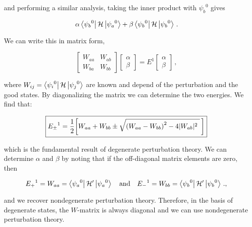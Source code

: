 \documentclass[12pt, titlepage]{article}
\begin{document}
and performing a similar analysis, taking the inner product with ${\psi_b}^0$ gives

\begin{equation}
\alpha\bra{{\psi_b}^0}\mathcal{H}\ket{{\psi_a}^0} + \beta\bra{{\psi_b}^0}\mathcal{H}\ket{{\psi_b}^0} \,. 
\end{equation}

We can write this in matrix form, 

\begin{equation}
	\begin{bmatrix}
	W_{aa} & W_{ab} \\ W_{ba} & W_{bb}
	\end{bmatrix}
	\begin{bmatrix}
	\alpha \\ \beta
	\end{bmatrix}
	= E^1
		\begin{bmatrix}
	\alpha \\ \beta
	\end{bmatrix} \,,
\end{equation}

where $W_{ij} = \bra{{\psi_i}^0}\mathcal{H}\ket{{\psi_j}^0}$ are known and depend of the perturbation and the good states. By diagonalizing the matrix we can determine the two energies. We find that:

\begin{equation}
	\boxed{{E_\pm}^1 = \frac{1}{2}\qty[W_{aa} + W_{bb} \pm \sqrt{\qty(W_{aa} - W_{bb})^2 - 4|W_{ab}|^2 \,\,}\,] }
\end{equation}

which is the fundamental result of degenerate perturbation theory. We can determine $\alpha$ and $\beta$ by noting that if the off-diagonal matrix elements are zero, then 

\begin{equation*}
	{E_+}^1 = W_{aa} = \bra{{\psi_a}^0}\mathcal{H}^\prime\ket{{\psi_a}^0} \quad\text{and}\quad {E_-}^1 = W_{bb} = \bra{{\psi_b}^0}\mathcal{H}^\prime\ket{{\psi_b}^0} \,.,
\end{equation*}

and we recover nondegenerate perturbation theory. Therefore, in the basis of degenerate states, the $W$-matrix is always diagonal and we can use nondegenerate perturbation theory. 
\end{document}

